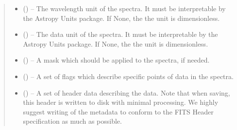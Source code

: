 \documentclass[letterpaper,11pt,english]{sphinxmanual}
\begin{document}
\begin{savenotes}
\begin{fulllineitems}
\begin{savenotes}
\begin{fulllineitems}
\begin{quote}
\begin{description}
\begin{itemize}
\item {} 
\sphinxAtStartPar
{} (\sphinxstyleliteralemphasis{\sphinxupquote{, }}) – The wavelength unit of the spectra. It must be interpretable by
the Astropy Units package. If None, the the unit is dimensionless.

\item {} 
\sphinxAtStartPar
{} (\sphinxstyleliteralemphasis{\sphinxupquote{, }}) – The data unit of the spectra. It must be interpretable by
the Astropy Units package. If None, the the unit is dimensionless.

\item {} 
\sphinxAtStartPar
{} (\sphinxstyleliteralemphasis{\sphinxupquote{, }}) – A mask which should be applied to the spectra, if needed.

\item {} 
\sphinxAtStartPar
{} (\sphinxstyleliteralemphasis{\sphinxupquote{, }}) – A set of flags which describe specific points of data in the
spectra.

\item {} 
\sphinxAtStartPar
{} (\sphinxstyleliteralemphasis{\sphinxupquote{, }}) – A set of header data describing the data. Note that when saving,
this header is written to disk with minimal processing. We highly
suggest writing of the metadata to conform to the FITS Header
specification as much as possible.

\end{itemize}

\end{description}\end{quote}

\end{fulllineitems}\end{savenotes}


\end{fulllineitems}
\end{savenotes}
\end{document}
